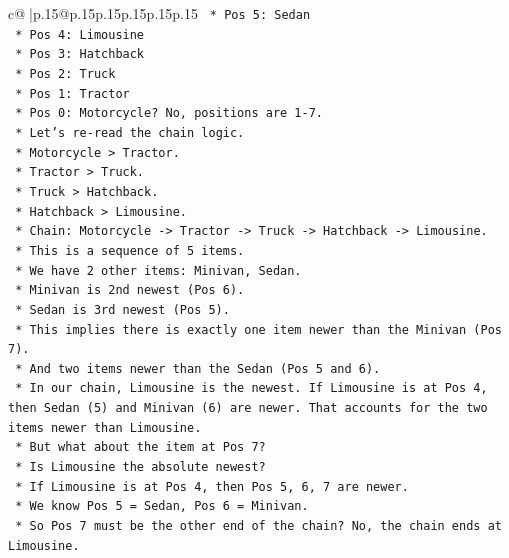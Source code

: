 \documentclass{article}
\begin{document}
{\begin{supertabular}{c@{$\;$}|p{.15\linewidth}@{}p{.15\linewidth}p{.15\linewidth}p{.15\linewidth}p{.15\linewidth}p{.15\linewidth}}
{{{\texttt{                *   Pos 5: Sedan} \\
\texttt{                *   Pos 4: Limousine} \\
\texttt{                *   Pos 3: Hatchback} \\
\texttt{                *   Pos 2: Truck} \\
\texttt{                *   Pos 1: Tractor} \\
\texttt{                *   Pos 0: Motorcycle? No, positions are 1{-}7.} \\
\texttt{            *   Let's re{-}read the chain logic.} \\
\texttt{                *   Motorcycle > Tractor.} \\
\texttt{                *   Tractor > Truck.} \\
\texttt{                *   Truck > Hatchback.} \\
\texttt{                *   Hatchback > Limousine.} \\
\texttt{                *   Chain: Motorcycle {-}> Tractor {-}> Truck {-}> Hatchback {-}> Limousine.} \\
\texttt{                *   This is a sequence of 5 items.} \\
\texttt{                *   We have 2 other items: Minivan, Sedan.} \\
\texttt{                *   Minivan is 2nd newest (Pos 6).} \\
\texttt{                *   Sedan is 3rd newest (Pos 5).} \\
\texttt{                *   This implies there is exactly one item newer than the Minivan (Pos 7).} \\
\texttt{                *   And two items newer than the Sedan (Pos 5 and 6).} \\
\texttt{                *   In our chain, Limousine is the newest. If Limousine is at Pos 4, then Sedan (5) and Minivan (6) are newer. That accounts for the two items newer than Limousine.} \\
\texttt{                *   But what about the item at Pos 7?} \\
\texttt{                *   Is Limousine the absolute newest?} \\
\texttt{                *   If Limousine is at Pos 4, then Pos 5, 6, 7 are newer.} \\
\texttt{                *   We know Pos 5 = Sedan, Pos 6 = Minivan.} \\
\texttt{                *   So Pos 7 must be the other end of the chain? No, the chain ends at Limousine.} \\
}}}
\end{supertabular}}
\end{document}
